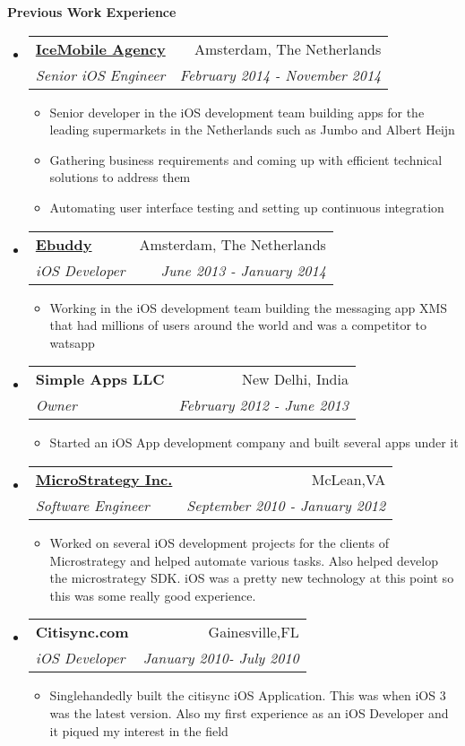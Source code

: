 \documentclass[letterpaper,11pt]{article}
\makeatletter
\newcommand{\resitem}[1]{\item #1 \vspace{-2pt}}
\newcommand{\resheading}[1]{{\large \colorbox{mygrey}{\begin{minipage}{\textwidth}{\textbf{#1 \vphantom{p\^{E}}}}\end{minipage}}}}
\newcommand{\ressubheading}[4]{
\begin{tabular*}{7.0in}{l@{\extracolsep{\fill}}r}
    \textbf{#1} & #2 \\
    \textit{#3} & \textit{#4} \\
\end{tabular*}\vspace{-6pt}}
\makeatother
\begin{document}
\vspace{0.2in}

\resheading{Previous Work Experience}
\begin{itemize}

\item
    \ressubheading{\href{http://www.icemobile.com}{IceMobile Agency}}{Amsterdam, The Netherlands}{Senior iOS Engineer}{February 2014 - November 2014}
    \begin{itemize}
        \resitem{Senior developer in the iOS development team building apps for the leading supermarkets in the Netherlands such as Jumbo and Albert Heijn}
        \resitem{Gathering business requirements and coming up with efficient technical solutions to address them}
        \resitem{Automating user interface testing and setting up continuous integration}
    \end{itemize}

\item
    \ressubheading{\href{http://www.ebuddy.com}{Ebuddy}}{Amsterdam, The Netherlands}{iOS Developer}{June 2013 - January 2014}
    \begin{itemize}
        \resitem{Working in the iOS development team building the messaging app XMS that had millions of users around the world and was a competitor to watsapp}
    \end{itemize}

\item
    \ressubheading{Simple Apps LLC}{New Delhi, India}{Owner}{February 2012 - June 2013}
    \begin{itemize}
        \resitem{Started an iOS App development company and built several apps under it}
    \end{itemize}

\item
    \ressubheading{\href{http://www.microstrategy.com/Company}{MicroStrategy Inc.}}{McLean,VA}{Software Engineer}{September 2010 - January 2012}
    \begin{itemize}
        \resitem{Worked on several iOS development projects for the clients of Microstrategy and helped automate various tasks. Also helped develop the microstrategy SDK. iOS was a pretty new technology at this point so this was some really good experience.}
    \end{itemize}
    

\item
    \ressubheading{Citisync.com}{Gainesville,FL}{iOS Developer}{January 2010- July 2010}
    \begin{itemize}
        \resitem{Singlehandedly built the citisync iOS Application. This was when iOS 3 was the latest version. Also my first experience as an iOS Developer and it piqued my interest in the field}
    \end{itemize}
                

\end{itemize}
\end{document}
